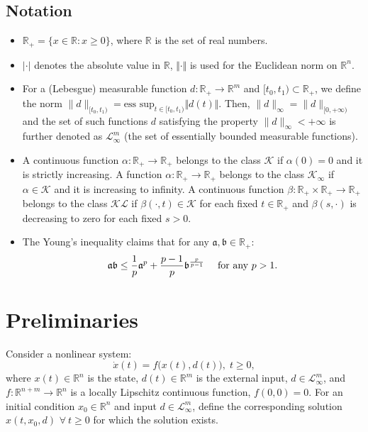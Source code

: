 \documentclass[letterpaper, 10 pt, conference]{ieeeconf}  %
\begin{document}
\subsection*{Notation}
\begin{itemize}
\item $\mathbb{R}_{+}=\{x\in\mathbb{R}:x\geq0\}$, where $\mathbb{R}$ is
the set of real numbers.
\item $|\cdot|$ denotes the absolute value in $\mathbb{R}$, $\Vert\cdot\Vert$
is used for the Euclidean norm on $\mathbb{R}^{n}$.
\item For a (Lebesgue) measurable function $d:\mathbb{R}_{+}\to\mathbb{R}^{m}$
and $[t_{0},t_{1})\subset\mathbb{R}_{+}$, we define the norm $\|d\|_{[t_{0},t_{1})}=\text{ess\ sup}_{t\in[t_{0},t_{1})}\Vert d(t)\Vert$.
Then, $\|d\|_{\infty}=\|d\|_{[0,+\infty)}$ and the set of such functions
$d$ satisfying the property $\|d\|_{\infty}<+\infty$ is further
denoted as $\mathcal{L}_{\infty}^{m}$ (the set of essentially bounded
measurable functions).
\item A continuous function $\alpha:\mathbb{R}_{+}\rightarrow\mathbb{R}_{+}$
belongs to the class $\mathcal{K}$ if $\alpha(0)=0$ and it is strictly
increasing. A function $\alpha:\mathbb{R}_{+}\rightarrow\mathbb{R}_{+}$
belongs to the class $\mathcal{K}_{\infty}$ if $\alpha\in\mathcal{K}$
and it is increasing to infinity. A continuous function $\beta:\mathbb{R}_{+}\times\mathbb{R}_{+}\to\mathbb{R}_{+}$
belongs to the class $\mathcal{KL}$ if $\beta(\cdot,t)\in\mathcal{K}$
for each fixed $t\in\mathbb{R}_{+}$ and $\beta(s,\cdot)$ is decreasing
to zero for each fixed $s>0$.
\item The Young's inequality claims that for any $\mathfrak{a},\mathfrak{b}\in\mathbb{R}_{+}$:
\[
\mathfrak{a}\mathfrak{b}\leq\frac{1}{p}\mathfrak{a}^{p}+\frac{p-1}{p}\mathfrak{b}^{\frac{p}{p-1}} \quad \hbox{ for any } p>1.
\]
\end{itemize}


\section{Preliminaries}
\label{sec:prelim}

Consider a nonlinear system:
\begin{equation}
\dot{x}(t)=f\bigl(x(t),d(t)\bigr),\;t\geq0,\label{eq:nonl_syst}
\end{equation}
where $x(t)\in\mathbb{R}^{n}$ is the state, $d(t)\in\mathbb{R}^{m}$
is the external input, $d\in\mathcal{L}_{\infty}^{m}$, and $f:\mathbb{R}^{n+m}\to\mathbb{R}^{n}$
is a locally Lipschitz continuous function, $f(0,0)=0$. For an initial
condition $x_{0}\in\mathbb{R}^{n}$ and input $d\in\mathcal{L}_{\infty}^{m}$,
define the corresponding solution $x(t,x_{0},d)$ $\forall \: t\geq0$
for which the solution exists.
\end{document}
